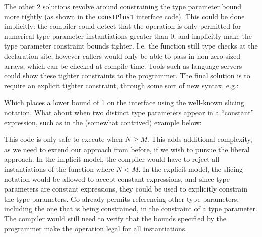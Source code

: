 The other 2 solutions revolve around constraining the type parameter bound more
tightly (as shown in the \texttt{constPlus1} interface code). This could be done
implicitly: the compiler could detect that the operation is only permitted for
numerical type parameter instantiations greater than 0, and implicitly make the
type parameter constraint bounds tighter. I.e. the function still type checks at
the declaration site, however callers would only be able to pass in non-zero
sized arrays, which can be checked at compile time. Tools such as language
servers could show these tighter constraints to the programmer. The final
solution is to require an explicit tighter constraint, through some sort of new
syntax, e.g.:


Which places a lower bound of 1 on the  interface using the well-known
slicing notation. What about when two distinct type parameters appear in a
``constant'' expression, such as in the (somewhat contrived) example below:


This code is only safe to execute when $N \ge M$. This adds additional
complexity, as we need to extend our approach from before, if we wish to pursue
the liberal approach. In the implicit model, the compiler would have to reject
all instantiations of the function where $N < M$. In the explicit model, the
slicing notation would be allowed to accept constant expressions, and since type
parameters are constant expressions, they could be used to explicitly constrain
the type parameters. Go already permits referencing other type parameters,
including the one that is being constrained, in the constraint of a type
parameter. The compiler would still need to verify that the bounds specified by
the programmer make the operation legal for all instantiations.


